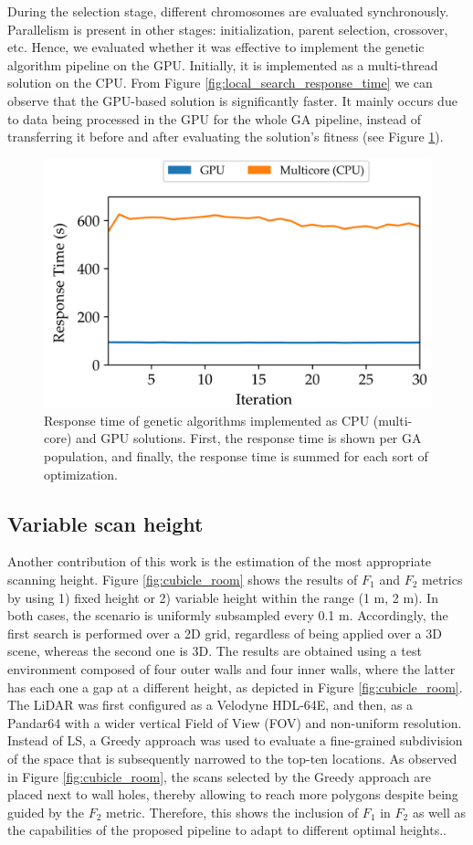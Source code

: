 During the selection stage, different chromosomes are evaluated synchronously. Parallelism is present in other stages: initialization, parent selection, crossover, etc. Hence, we evaluated whether it was effective to implement the genetic algorithm pipeline on the GPU. Initially, it is implemented as a multi-thread solution on the CPU. From Figure \ref{fig:local_search_response_time} we can observe that the GPU-based solution is significantly faster. It mainly occurs due to data being processed in the GPU for the whole GA pipeline, instead of transferring it before and after evaluating the solution's fitness (see Figure \ref{fig:ga_response_time}).

\begin{figure}
    \centering
    \includegraphics[width=.6\linewidth]{figs/lidar_optimization/response_time_results_ga.png}
	\caption{Response time of genetic algorithms implemented as CPU (multi-core) and GPU solutions. First, the response time is shown per GA population, and finally, the response time is summed for each sort of optimization.}
	\label{fig:ga_response_time}
\end{figure}

\subsection{Variable scan height}

Another contribution of this work is the estimation of the most appropriate scanning height. Figure \ref{fig:cubicle_room} shows the results of $F_1$ and $F_2$ metrics by using 1) fixed height or 2) variable height within the range (1 \si{\meter}, 2 \si{\meter}). In both cases, the scenario is uniformly subsampled every 0.1 \si{\meter}. Accordingly, the first search is performed over a 2D grid, regardless of being applied over a 3D scene, whereas the second one is 3D. The results are obtained using a test environment composed of four outer walls and four inner walls, where the latter has each one a gap at a different height, as depicted in Figure \ref{fig:cubicle_room}. The LiDAR was first configured as a Velodyne HDL-64E, and then, as a Pandar64 with a wider vertical Field of View (FOV) and non-uniform resolution. Instead of LS, a Greedy approach was used to evaluate a fine-grained subdivision of the space that is subsequently narrowed to the top-ten locations. As observed in Figure \ref{fig:cubicle_room}, the scans selected by the Greedy approach are placed next to wall holes, thereby allowing to reach more polygons despite being guided by the $F_2$ metric. Therefore, this shows the inclusion of $F_1$ in $F_2$ as well as the capabilities of the proposed pipeline to adapt to different optimal heights..

